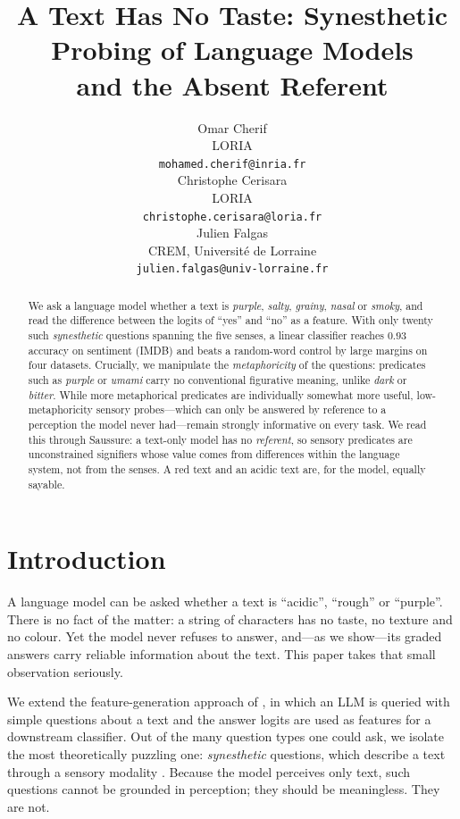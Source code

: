 \documentclass[11pt]{article}
\title{A Text Has No Taste: Synesthetic Probing of Language Models\\ and the Absent Referent}
\author{Omar Cherif \\
  LORIA \\
  \texttt{mohamed.cherif@inria.fr} \\\And
  Christophe Cerisara \\
  LORIA\\
  \texttt{christophe.cerisara@loria.fr}  \\\AND
  Julien Falgas \\
  CREM, Université de Lorraine \\
  \texttt{julien.falgas@univ-lorraine.fr} \\}
\begin{document}
\maketitle

\begin{abstract}
We ask a language model whether a text is \emph{purple}, \emph{salty}, \emph{grainy}, \emph{nasal} or \emph{smoky}, and read the difference between the logits of ``yes'' and ``no'' as a feature. With only twenty such \emph{synesthetic} questions spanning the five senses, a linear classifier reaches $0.93$ accuracy on sentiment (IMDB) and beats a random-word control by large margins on four datasets. Crucially, we manipulate the \emph{metaphoricity} of the questions: predicates such as \emph{purple} or \emph{umami} carry no conventional figurative meaning, unlike \emph{dark} or \emph{bitter}. While more metaphorical predicates are individually somewhat more useful, low-metaphoricity sensory probes---which can only be answered by reference to a perception the model never had---remain strongly informative on every task. We read this through Saussure: a text-only model has no \emph{referent}, so sensory predicates are unconstrained signifiers whose value comes from differences within the language system, not from the senses. A red text and an acidic text are, for the model, equally sayable.
\end{abstract}

\section{Introduction}
A language model can be asked whether a text is ``acidic'', ``rough'' or ``purple''. There is no fact of the matter: a string of characters has no taste, no texture and no colour. Yet the model never refuses to answer, and---as we show---its graded answers carry reliable information about the text. This paper takes that small observation seriously.

We extend the feature-generation approach of \citet{florescuAlgorithmicallyGeneratingNew2019}, in which an LLM is queried with simple questions about a text and the answer logits are used as features for a downstream classifier. Out of the many question types one could ask, we isolate the most theoretically puzzling one: \emph{synesthetic} questions, which describe a text through a sensory modality \citep{cytowicSynesthesiaUnionSenses2002}. Because the model perceives only text, such questions cannot be grounded in perception; they should be meaningless. They are not.
\end{document}
